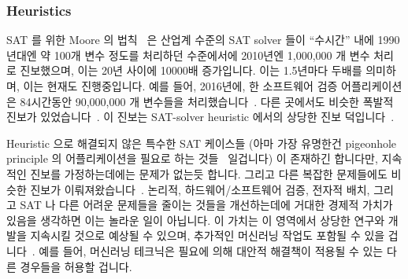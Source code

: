 \subsubsection{Heuristics}
\label{sec:future:Heuristics}

SAT 를 위한 Moore 의 법칙~\cite[Fig.~2.3]{Kroening:2008:DPA:1391237} 은 산업계
수준의 SAT solver 들이 ``수시간'' 내에 1990년대엔 약 100개 변수 정도를 처리하던
수준에서에 2010년엔 1,000,000 개 변수 처리로 진보했으며, 이는 20년 사이에
10000배 증가입니다.
이는 1.5년마다 두배를 의미하며, 이는 현재도 진행중입니다.
예를 들어, 2016년에, 한 소프트웨어 검증 어플리케이션은 84시간동안 90,000,000 개
변수들을 처리했습니다~\cite{LihaoLiang2016VerifyTreeRCU}.
다른 곳에서도 비슷한 폭발적 진보가
있었습니다~\cite{SharadMalik2010SATSolverHistory,SATCompetition2002,vanHarmelen:2007:HKR:1557461,Malik:2009:BST:1536616.1536637,JamesEzick2014ExtremeSAT}.
이 진보는 SAT-solver heuristic 에서의 상당한 진보
덕입니다~\cite{Kroening:2008:DPA:1391237,Zhang:2002:QEB:647771.734434,SharadMalik2010SATSolverHistory,Malik:2009:BST:1536616.1536637,Audemard:2009:PLC:1661445.1661509}.

Heuristic 으로 해결되지 않은 특수한 SAT 케이스들 (아마 가장 유명한건 pigeonhole
principle 의 어플리케이션을 필요로 하는
것들~\cite[page~38]{Kroening:2008:DPA:1391237} 일겁니다) 이 존재하긴 합니다만,
지속적인 진보를 가정하는데에는 문제가 없는듯 합니다.
그리고 다른 복잡한 문제들에도 비슷한 진보가
이뤄져왔습니다~\cite{WikipediaPrimalityTest,WikipediaTSP,WikipediaIntegerFactorization}.
논리적, 하드웨어/소프트웨어 검증, 전자적 배치, 그리고 SAT 나 다른 어려운
문제들을 줄이는 것들을 개선하는데에 거대한 경제적 가치가 있음을 생각하면 이는
놀라운 일이 아닙니다.
이 가치는 이 영역에서 상당한 연구와 개발을 지속시킬 것으로 예상될 수 있으며,
추가적인 머신러닝 작업도 포함될 수 있을
겁니다~\cite{ShaiHaim2009SAT-MachineLearning}.
예를 들어, 머신러닝 테크닉은 필요에 의해 대안적 해결책이 적용될 수 있는 다른
경우들을 허용할 겁니다.
\iffalse

